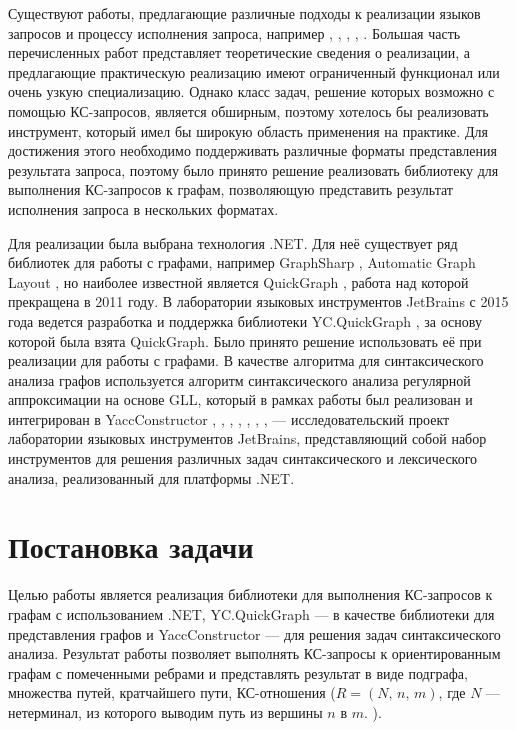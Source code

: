 \documentclass[14pt]{matmex-diploma-custom}
\begin{document}
	Существуют работы, предлагающие различные подходы к реализации языков запросов и  процессу исполнения запроса, например \cite{sevon2008subgraph}, \cite{hellings2014conjunctive}, \cite{zhang2016context}, \cite{abiteboul1997regular}, \cite{koschmieder2012regular}. Большая часть перечисленных работ представляет теоретические сведения о реализации, а предлагающие практическую реализацию имеют ограниченный функционал или очень узкую специализацию. Однако класс задач, решение которых возможно с помощью КС-запросов, является обширным, поэтому хотелось бы реализовать инструмент, который имел бы широкую область применения на практике. Для достижения этого необходимо поддерживать различные форматы представления результата запроса, поэтому было принято решение реализовать библиотеку для выполнения КС-запросов к графам, позволяющую представить результат исполнения запроса в нескольких форматах.
	
	Для реализации была выбрана технология .NET. Для неё существует ряд библиотек для работы с графами, например GraphSharp \cite{graphsharp}, Automatic Graph Layout \cite{agl}, но наиболее известной является QuickGraph \cite{quickgraph}, работа над которой прекращена в 2011 году. В лаборатории языковых инструментов JetBrains с 2015 года ведется разработка и поддержка библиотеки YC.QuickGraph \cite{YC.QuickGraph}, за основу которой была взята QuickGraph. Было принято решение использовать её при реализации для работы с графами. В качестве алгоритма для синтаксического анализа графов используется алгоритм синтаксического анализа регулярной аппроксимации на основе GLL\cite{gll}, который в рамках работы \cite{ragRelaxedParsing} был реализован и интегрирован в YaccConstructor \cite{YaccConstructorPage}, \cite{авдюхин2012создание}, \cite{кириленко2013разработка}, \cite{gsv_phd}, \cite{кириленко2013разработка}, \cite{азимов2016syntax}, \cite{ковалев2016реализация}, \cite{полубелова2014генератор} --- исследовательский проект лаборатории языковых инструментов JetBrains, представляющий собой набор инструментов для решения различных задач синтаксического и лексического анализа, реализованный для платформы .NET.
	
\section{Постановка задачи}
    Целью работы является реализация библиотеки для выполнения КС-запросов к графам с использованием .NET, YC.QuickGraph --- в качестве библиотеки для представления графов и YaccConstructor --- для решения задач синтаксического анализа. Результат работы позволяет выполнять КС-запросы к ориентированным графам с помеченными ребрами и представлять результат в виде подграфа, множества путей, кратчайшего пути, КС-отношения (\(R = (N,\, n,\, m)\), где \(N\) --- нетерминал, из которого выводим путь из вершины \(n\) в \(m\). ). 
    
\end{document}
